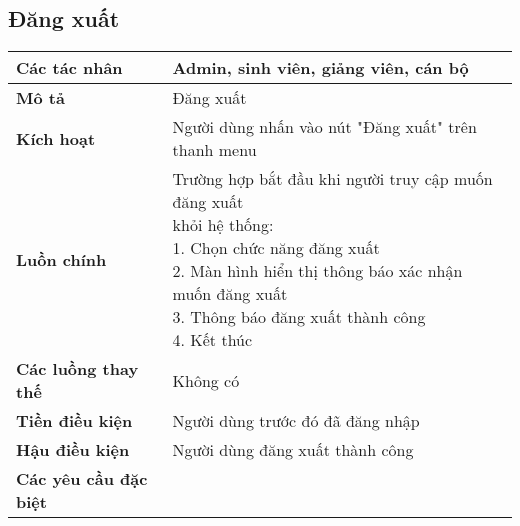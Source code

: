 \subsection{Đăng xuất}
\begin{tabular}{|l|p{}|}
	\hline
	\textbf{Các tác nhân}         & Admin, sinh viên, giảng viên, cán bộ                              \\
	\hline
	\textbf{Mô tả}                & Đăng xuất                                                                        \\
	\hline
	\textbf{Kích hoạt}            & Người dùng nhấn vào nút "Đăng xuất" trên thanh menu                              \\
	\hline
	\textbf{Luồn chính}           & \makecell[l]{Trường hợp bắt đầu khi người truy cập muốn đăng xuất \\ khỏi hệ thống: \\ 1. Chọn chức năng đăng xuất \\ 2. Màn hình hiển thị thông báo xác nhận muốn đăng xuất \\ 3. Thông báo đăng xuất thành công \\ 4. Kết thúc} \\
	\hline
	\textbf{Các luồng thay thế}   & Không có                                                                         \\
	\hline
	\textbf{Tiền điều kiện}       & Người dùng trước đó đã đăng nhập                                                 \\
	\hline
	\textbf{Hậu điều kiện}        & Người dùng đăng xuất thành công                                                  \\
	\hline
	\textbf{Các yêu cầu đặc biệt} &                                                                                  \\
	\hline
\end{tabular}

